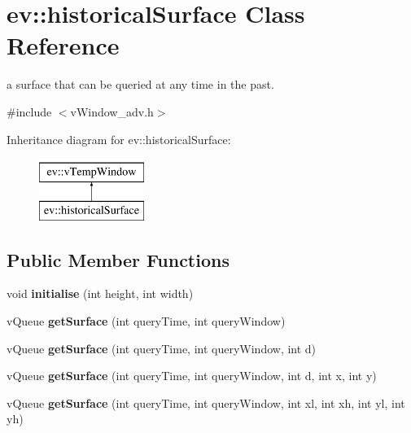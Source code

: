 \hypertarget{classev_1_1historicalSurface}{}\section{ev\+:\+:historical\+Surface Class Reference}
\label{classev_1_1historicalSurface}


a surface that can be queried at any time in the past.  




{\ttfamily \#include $<$v\+Window\+\_\+adv.\+h$>$}

Inheritance diagram for ev\+:\+:historical\+Surface\+:\begin{figure}[H]
\begin{center}
\leavevmode
\includegraphics[height=2.000000cm]{classev_1_1historicalSurface}
\end{center}
\end{figure}
\subsection*{Public Member Functions}
\begin{DoxyCompactItemize}
\item 
void {\bfseries initialise} (int height, int width)\hypertarget{classev_1_1historicalSurface_adbe662bedcf6ee9c87f9b78d15c8ae85}{}\label{classev_1_1historicalSurface_adbe662bedcf6ee9c87f9b78d15c8ae85}

\item 
v\+Queue {\bfseries get\+Surface} (int query\+Time, int query\+Window)\hypertarget{classev_1_1historicalSurface_a03476e5a9cff0d369fef76711c6ebea5}{}\label{classev_1_1historicalSurface_a03476e5a9cff0d369fef76711c6ebea5}

\item 
v\+Queue {\bfseries get\+Surface} (int query\+Time, int query\+Window, int d)\hypertarget{classev_1_1historicalSurface_a289a2d3cb116fb1cdb99d38b03d74dd0}{}\label{classev_1_1historicalSurface_a289a2d3cb116fb1cdb99d38b03d74dd0}

\item 
v\+Queue {\bfseries get\+Surface} (int query\+Time, int query\+Window, int d, int x, int y)\hypertarget{classev_1_1historicalSurface_a10f0938bac2fc0b7a0f5624dfcd65f2f}{}\label{classev_1_1historicalSurface_a10f0938bac2fc0b7a0f5624dfcd65f2f}

\item 
v\+Queue {\bfseries get\+Surface} (int query\+Time, int query\+Window, int xl, int xh, int yl, int yh)\hypertarget{classev_1_1historicalSurface_a18830cb21753a190270bf03108c95f71}{}\label{classev_1_1historicalSurface_a18830cb21753a190270bf03108c95f71}

\end{DoxyCompactItemize}
